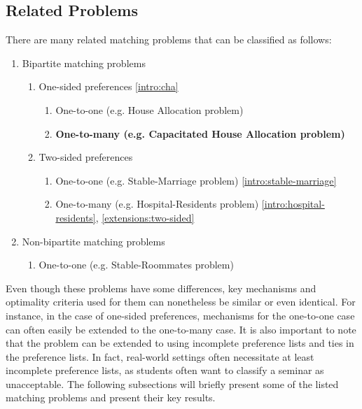 \subsection{Related Problems}
There are many related matching problems that can be classified as follows:
\begin{enumerate}
    \item Bipartite matching problems
    \begin{enumerate}
        \item One-sided preferences \ref{intro:cha}
        \begin{enumerate}
            \item One-to-one (e.g. House Allocation problem)
            \item \textbf{One-to-many (e.g. Capacitated House Allocation problem)} 
        \end{enumerate}
        \item Two-sided preferences
        \begin{enumerate}
            \item One-to-one (e.g. Stable-Marriage problem) \ref{intro:stable-marriage}
            \item One-to-many (e.g. Hospital-Residents problem) \ref{intro:hospital-residents}, \ref{extensions:two-sided}
        \end{enumerate}
    \end{enumerate}
    \item Non-bipartite matching problems 
    \begin{enumerate}
        \item One-to-one (e.g. Stable-Roommates problem)
    \end{enumerate}
\end{enumerate}
Even though these problems have some differences, key mechanisms and optimality criteria used for them can nonetheless be similar or even identical. For instance, in the case of one-sided preferences, mechanisms for the one-to-one case can often easily be extended to the one-to-many case. It is also important to note that the problem can be extended to using incomplete preference lists and ties in the preference lists. In fact, real-world settings often necessitate at least incomplete preference lists, as students often want to classify a seminar as unacceptable. The following subsections will briefly present some of the listed matching problems and present their key results.  

